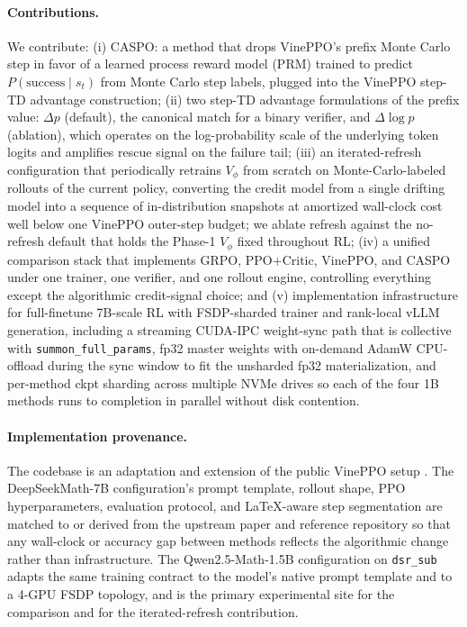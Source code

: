 \documentclass[11pt]{article}
\newcommand{\caspo}{\textsc{CASPO}}
\newcommand{\ppocritic}{PPO+Critic}
\newcommand{\grpo}{GRPO}
\newcommand{\vineppo}{VinePPO}
\begin{document}
\paragraph{Contributions.} We contribute:
(i) \caspo{}: a method that drops \vineppo{}'s prefix Monte Carlo step in
favor of a learned process reward model (PRM) trained to predict
$P(\text{success} \mid s_t)$ from Monte Carlo step labels, plugged into
the \vineppo{} step-TD advantage construction;
(ii) two step-TD advantage formulations of the prefix value: $\Delta p$
(default), the canonical match for a binary verifier, and $\Delta\log p$
(ablation), which operates on the log-probability scale of the underlying
token logits and amplifies rescue signal on the failure tail;
(iii) an iterated-refresh configuration that periodically retrains
$V_\phi$ from scratch on Monte-Carlo-labeled rollouts of the current
policy, converting the credit model from a single drifting model into a
sequence of in-distribution snapshots at amortized wall-clock cost well
below one \vineppo{} outer-step budget; we ablate refresh against the
no-refresh default that holds the Phase-1 $V_\phi$ fixed throughout RL;
(iv) a unified comparison stack that implements \grpo{}, \ppocritic{},
\vineppo{}, and \caspo{} under one trainer, one verifier, and one rollout
engine, controlling everything except the algorithmic credit-signal choice; and
(v) implementation infrastructure for full-finetune 7B-scale RL with
FSDP-sharded trainer and rank-local vLLM generation, including a streaming
CUDA-IPC weight-sync path that is collective with
\texttt{summon\_full\_params}, fp32 master weights with on-demand AdamW
CPU-offload during the sync window to fit the unsharded fp32 materialization,
and per-method ckpt sharding across multiple NVMe drives so each of the four
1B methods runs to completion in parallel without disk contention.

\paragraph{Implementation provenance.} The codebase is an adaptation and
extension of the public \vineppo{} setup \citep{vineppo2024,vineppocode}. The
DeepSeekMath-7B configuration's prompt template, rollout shape, PPO
hyperparameters, evaluation protocol, and LaTeX-aware step segmentation are
matched to or derived from the upstream paper and reference repository so
that any wall-clock or accuracy gap between methods reflects the algorithmic
change rather than infrastructure. The Qwen2.5-Math-1.5B configuration on
\texttt{dsr\_sub} adapts the same training contract to the model's native
prompt template and to a 4-GPU FSDP topology, and is the primary
experimental site for the comparison and for the iterated-refresh
contribution.
\end{document}
